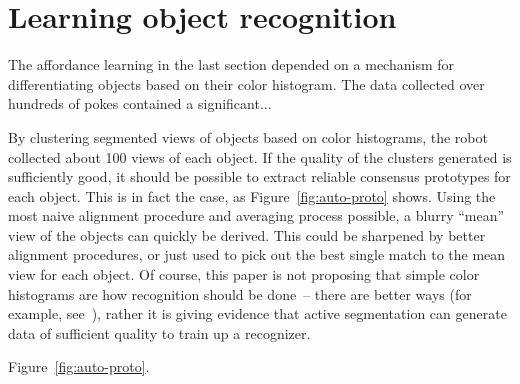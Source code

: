 
\section{Learning object recognition}

The affordance learning in the last section depended on a mechanism
for differentiating objects based on their color histogram.
The data collected over hundreds of pokes contained a significant...

By clustering segmented views of objects based on color histograms,
the robot collected about 100 views of each object.  
If the quality of the clusters generated is sufficiently good, it
should be possible to extract reliable consensus prototypes for each 
object.  This is in fact the case, as Figure~\ref{fig:auto-proto}
shows.  Using the most naive alignment procedure and averaging
process possible, a blurry ``mean'' view of the objects can
quickly be derived.  This could be sharpened by better alignment
procedures, or just used to pick out the best single match
to the mean view for each object.
%
Of course, this paper is not proposing
that simple color histograms
are how recognition should be done~--
there are better ways 
(for example, see~\cite{schiele00recognition}),
rather it is giving evidence that 
active segmentation can generate data of 
sufficient quality to train up a recognizer.


Figure~\ref{fig:auto-proto}.

